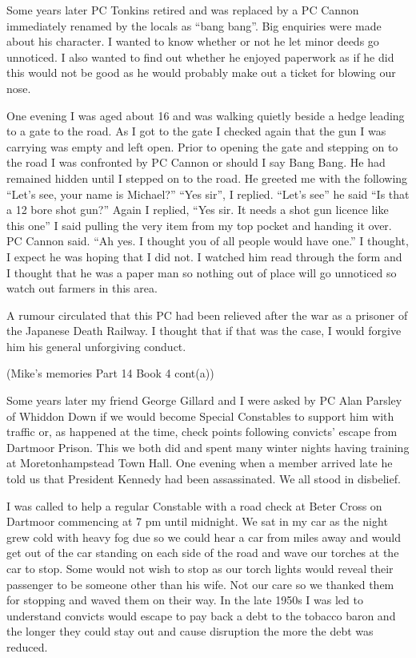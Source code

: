 Some years later PC Tonkins retired and was replaced by a PC Cannon immediately
renamed by the locals as ``bang bang''.  Big enquiries were made about his
character.  I wanted to know whether or not he let minor deeds go unnoticed.  I
also wanted to find out whether he enjoyed paperwork as if he did this would
not be good as he would probably make out a ticket for blowing our nose.

One evening I was aged about 16 and was walking quietly beside a hedge leading
to a gate to the road.  As I got to the gate I checked again that the gun I was
carrying was empty and left open.  Prior to opening the gate and stepping on to
the road I was confronted by PC Cannon or should I say Bang Bang.  He had
remained hidden until I stepped on to the road.  He greeted me with the
following ``Let's see, your name is Michael?''  ``Yes sir'', I replied. ``Let's
see'' he said ``Is that a 12 bore shot gun?''  Again I replied, ``Yes sir.  It
needs a shot gun licence like this one'' I said pulling the very item from my
top pocket and handing it over.  PC Cannon said.  ``Ah yes.  I thought you of
all people would have one.''  I thought, I expect he was hoping that I did not.
I watched him read through the form and I thought that he was a paper man so
nothing out of place will go unnoticed so watch out farmers in this area.

A rumour circulated that this PC had been relieved after the war as a prisoner
of the Japanese Death Railway.  I thought that if that was the case, I would
forgive him his general unforgiving conduct.

(Mike's memories Part 14 Book 4 cont(a))

Some years later my friend George Gillard and I were asked by PC Alan Parsley of
Whiddon Down if we would become Special Constables to support him with traffic
or, as happened at the time, check points following convicts' escape from
Dartmoor Prison.   This we both did and spent many winter nights having
training at Moretonhampstead Town Hall.  One evening when a member arrived late
he told us that President Kennedy had been assassinated.  We all stood in
disbelief.

I was called to help a regular Constable with a road check at Beter Cross on
Dartmoor commencing at 7 pm until midnight.  We sat in my car as the night grew
cold with heavy fog due so we could hear a car from miles away and would get
out of the car standing on each side of the road and wave our torches at the
car to stop.  Some would not wish to stop as our torch lights would reveal
their passenger to be someone other than his wife.  Not our care so we thanked
them for stopping and waved them on their way.  In the late 1950s I was led to
understand convicts would escape to pay back a debt to the tobacco baron and
the longer they could stay out and cause disruption the more the debt was
reduced.


